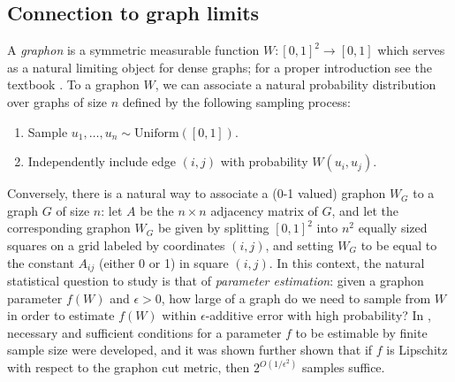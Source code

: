 \documentclass[final, 12pt]{colt2018}
\theoremstyle{definition}
\theoremstyle{plain}
\begin{document}
\subsection{Connection to graph limits}
A \emph{graphon} is a symmetric measurable function $W : [0,1]^2 \to [0,1]$ which serves as a natural limiting object for dense graphs; for a proper introduction see the textbook \citep{lovasz2012large}. To a graphon $W$, we can associate 
a natural probability distribution over graphs of size
$n$ defined by the following sampling process:
\begin{enumerate}
\item Sample $u_1, \ldots, u_n \sim \text{Uniform}([0,1])$.
\item Independently include edge $(i,j)$ with probability $W(u_i,u_j)$.
\end{enumerate}
Conversely, there is a natural way to associate a (0-1 valued) graphon $W_G$ to a graph $G$ of size $n$: let $A$ be the $n \times n$ adjacency matrix of $G$,
and let the corresponding graphon $W_G$ be given by splitting $[0,1]^2$ into
$n^2$ equally sized squares on a grid labeled by coordinates $(i,j)$, and setting $W_G$ to be equal to the constant $A_{ij}$ (either 0 or 1) in square $(i,j)$.
In this context, the natural statistical question to study is that of \emph{parameter estimation}: given a graphon parameter $f(W)$ and $\epsilon > 0$, how large of a graph do we need to sample from $W$ in order to estimate $f(W)$ within $\epsilon$-additive error with high probability? In \citep{borgs2008convergent}, necessary and sufficient conditions for a parameter $f$ to be estimable by finite sample size were developed, and it was shown further shown that if $f$ is Lipschitz with respect to the graphon cut metric, then $2^{O(1/\epsilon^2)}$ samples suffice.
\end{document}
